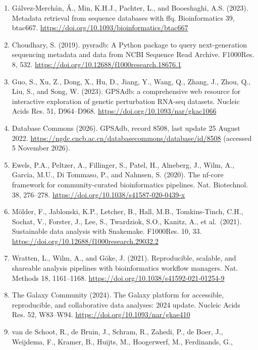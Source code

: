 \documentclass[11pt,a4paper]{article}
\begin{document}
\begin{enumerate}
  and Notredame, C. (2017). Nextflow enables reproducible computational
  workflows. Nat. Biotechnol. 35, 316--319.
  \url{https://doi.org/10.1038/nbt.3820}
\item
  Gálvez-Merchán, Á., Min, K.H.J., Pachter, L., and Booeshaghi, A.S.
  (2023). Metadata retrieval from sequence databases with ffq.
  Bioinformatics 39, btac667.
  \url{https://doi.org/10.1093/bioinformatics/btac667}
\item
  Choudhary, S. (2019). pysradb: A Python package to query
  next-generation sequencing metadata and data from NCBI Sequence Read
  Archive. F1000Res. 8, 532.
  \url{https://doi.org/10.12688/f1000research.18676.1}
\item
  Guo, S., Xu, Z., Dong, X., Hu, D., Jiang, Y., Wang, Q., Zhang, J.,
  Zhou, Q., Liu, S., and Song, W. (2023). GPSAdb: a comprehensive web
  resource for interactive exploration of genetic perturbation RNA-seq
  datasets. Nucleic Acids Res. 51, D964--D968.
  \url{https://doi.org/10.1093/nar/gkac1066}
\item
  Database Commons (2026). GPSAdb, record 8508, last update 25 August
  2022. \url{https://ngdc.cncb.ac.cn/databasecommons/database/id/8508}
  (accessed 5 November 2026).
\item
  Ewels, P.A., Peltzer, A., Fillinger, S., Patel, H., Alneberg, J.,
  Wilm, A., Garcia, M.U., Di Tommaso, P., and Nahnsen, S. (2020). The
  nf-core framework for community-curated bioinformatics pipelines. Nat.
  Biotechnol. 38, 276--278.
  \url{https://doi.org/10.1038/s41587-020-0439-x}
\item
  Mölder, F., Jablonski, K.P., Letcher, B., Hall, M.B., Tomkins-Tinch,
  C.H., Sochat, V., Forster, J., Lee, S., Twardziok, S.O., Kanitz, A.,
  et al.~(2021). Sustainable data analysis with Snakemake. F1000Res. 10,
  33. \url{https://doi.org/10.12688/f1000research.29032.2}
\item
  Wratten, L., Wilm, A., and Göke, J. (2021). Reproducible, scalable,
  and shareable analysis pipelines with bioinformatics workflow
  managers. Nat. Methods 18, 1161--1168.
  \url{https://doi.org/10.1038/s41592-021-01254-9}
\item
  The Galaxy Community (2024). The Galaxy platform for accessible,
  reproducible, and collaborative data analyses: 2024 update. Nucleic
  Acids Res. 52, W83--W94. \url{https://doi.org/10.1093/nar/gkae410}
\item
  van de Schoot, R., de Bruin, J., Schram, R., Zahedi, P., de Boer, J.,
  Weijdema, F., Kramer, B., Huijts, M., Hoogerwerf, M., Ferdinands, G.,

\end{enumerate}
\end{document}

